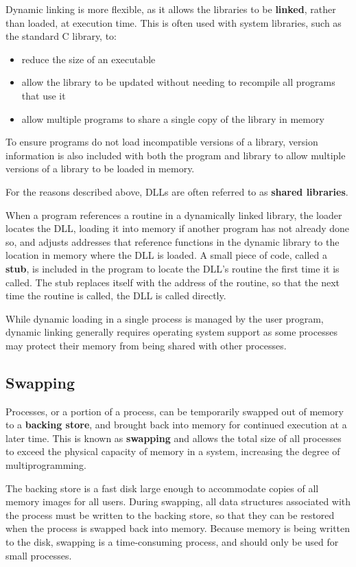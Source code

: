 \documentclass{article}
\begin{document}
Dynamic linking is more flexible, as it allows the libraries to be
\textbf{linked}, rather than loaded, at execution time. This is often
used with system libraries, such as the standard C library, to:
\begin{itemize}
    \item reduce the size of an executable
    \item allow the library to be updated without needing to recompile
          all programs that use it
    \item allow multiple programs to share a single copy of the library
          in memory
\end{itemize}
To ensure programs do not load incompatible versions of a library,
version information is also included with both the program and library
to allow multiple versions of a library to be loaded in memory.

For the reasons described above, DLLs are often referred to as
\textbf{shared libraries}.

When a program references a routine in a dynamically linked library,
the loader locates the DLL, loading it into memory if another program
has not already done so, and adjusts addresses that reference functions
in the dynamic library to the location in memory where the DLL is
loaded. A small piece of code, called a \textbf{stub}, is included in
the program to locate the DLL's routine the first time it is called.
The stub replaces itself with the address of the routine, so that the
next time the routine is called, the DLL is called directly.

While dynamic loading in a single process is managed by the user
program, dynamic linking generally requires operating system support as
some processes may protect their memory from being shared with other
processes.
\subsection{Swapping}
Processes, or a portion of a process, can be temporarily swapped out of
memory to a \textbf{backing store}, and brought back into memory for
continued execution at a later time. This is known as \textbf{swapping}
and allows the total size of all processes to exceed the physical
capacity of memory in a system, increasing the degree of
multiprogramming.

The backing store is a fast disk large enough to accommodate copies of
all memory images for all users. During swapping, all data structures
associated with the process must be written to the backing store, so
that they can be restored when the process is swapped back into memory.
Because memory is being written to the disk, swapping is a
time-consuming process, and should only be used for small processes.
\end{document}
